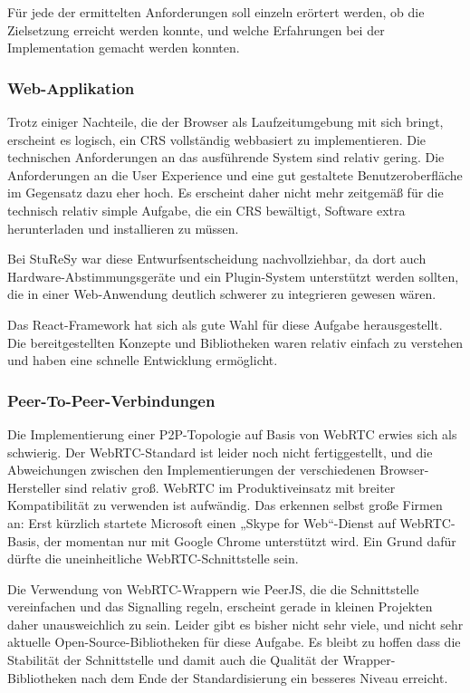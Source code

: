 Für jede der ermittelten Anforderungen soll einzeln erörtert werden, ob die Zielsetzung erreicht werden konnte, und welche Erfahrungen bei der Implementation gemacht werden konnten.

\subsubsection*{Web-Applikation}
Trotz einiger Nachteile, die der Browser als Laufzeitumgebung mit sich bringt, erscheint es logisch, ein CRS vollständig webbasiert zu implementieren. Die technischen Anforderungen an das ausführende System sind relativ gering. Die Anforderungen an die User Experience und eine gut gestaltete Benutzeroberfläche im Gegensatz dazu eher hoch. Es erscheint daher nicht mehr zeitgemäß für die technisch relativ simple Aufgabe, die ein CRS bewältigt, Software extra herunterladen und installieren zu müssen.

Bei StuReSy war diese Entwurfsentscheidung nachvollziehbar, da dort auch Hardware-Abstimmungsgeräte und ein Plugin-System unterstützt werden sollten, die in einer Web-Anwendung deutlich schwerer zu integrieren gewesen wären.

Das React-Framework hat sich als gute Wahl für diese Aufgabe herausgestellt. Die bereitgestellten Konzepte und Bibliotheken waren relativ einfach zu verstehen und haben eine schnelle Entwicklung ermöglicht.

\subsubsection*{Peer-To-Peer-Verbindungen}
Die Implementierung einer P2P-Topologie auf Basis von WebRTC erwies sich als schwierig. Der WebRTC-Standard ist leider noch nicht fertiggestellt, und die Abweichungen zwischen den Implementierungen der verschiedenen Browser-Hersteller sind relativ groß. WebRTC im Produktiveinsatz mit breiter Kompatibilität zu verwenden ist aufwändig. Das erkennen selbst große Firmen an: Erst kürzlich startete Microsoft einen „Skype for Web“-Dienst auf WebRTC-Basis, der momentan nur mit Google Chrome unterstützt wird. Ein Grund dafür dürfte die uneinheitliche WebRTC-Schnittstelle sein.

Die Verwendung von WebRTC-Wrappern wie PeerJS, die die Schnittstelle vereinfachen und das Signalling regeln, erscheint gerade in kleinen Projekten daher unausweichlich zu sein. Leider gibt es bisher nicht sehr viele, und nicht sehr aktuelle Open-Source-Bibliotheken für diese Aufgabe. Es bleibt zu hoffen dass die Stabilität der Schnittstelle und damit auch die Qualität der Wrapper-Bibliotheken nach dem Ende der Standardisierung ein besseres Niveau erreicht.

